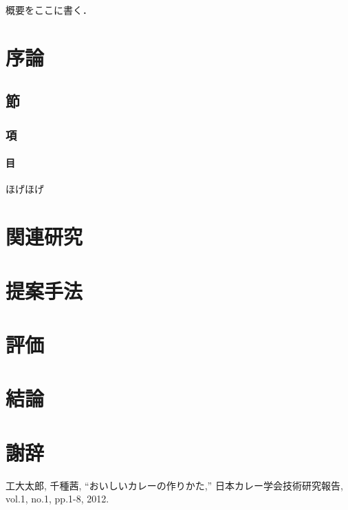 \documentclass[a4paper,12pt]{jsarticle}
\date{平成xx年3月}
\begin{document}
\Front %
\MakeTitlePage

\begin{Abstract}
概要をここに書く．
\end{Abstract}

\TableOfContents

\Main %

\section{序論}

\subsection{節}

\subsubsection{項}

\paragraph{目}
ほげほげ

\section{関連研究}

\section{提案手法}

\section{評価}

\section{結論}

\section*{謝辞}

\begin{thebibliography}{99}

\end{thebibliography}

\begin{Achievements}
工大太郎, 千種茜,
``おいしいカレーの作りかた,''
日本カレー学会技術研究報告, vol.1, no.1, pp.1-8, 2012.
\end{Achievements}
\end{document}
